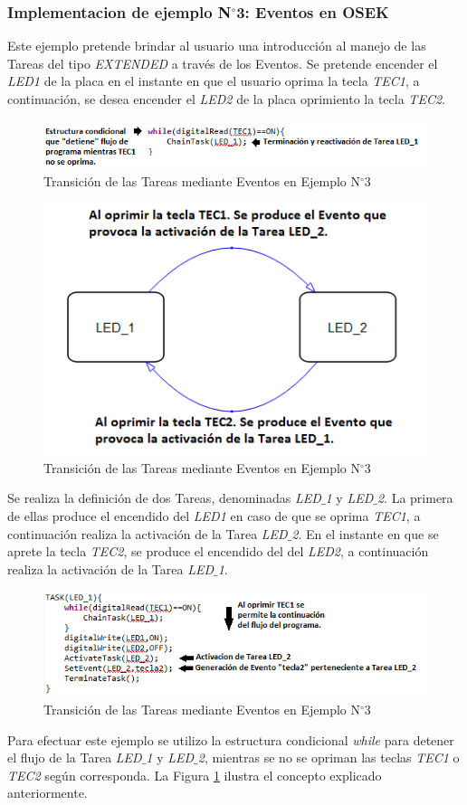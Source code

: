 \documentclass[12pt,letterpaper]{article}
\begin{document}
\subsubsection{Implementacion de ejemplo N$^{\circ}$3: Eventos en OSEK}
Este ejemplo pretende brindar al usuario una introducción al manejo de las Tareas del tipo \textit{EXTENDED} a través de los Eventos. Se pretende encender el \textit{LED1} de la placa en el instante en que el usuario oprima la tecla \textit{TEC1}, a continuación, se desea encender el \textit{LED2} de la placa oprimiento la tecla \textit{TEC2}.
\begin{center}
\begin{figure}[!h]
\centering
\includegraphics[width=10 cm]{figuras/f41.png}
\caption{Transición de las Tareas mediante Eventos en Ejemplo N$^{\circ}$3}
\label{ejemplo3}
\end{figure}
\end{center}
\begin{figure}[!h]
\centering
\includegraphics[width=9 cm]{figuras/f26.png}
\caption{Transición de las Tareas mediante Eventos en Ejemplo N$^{\circ}$3}
\label{Fig41}
\end{figure}
Se realiza la definición de dos Tareas, denominadas \textit{LED$\_$1} y \textit{LED$\_$2}. La primera de ellas produce el encendido del \textit{LED1} en caso de que se oprima \textit{TEC1}, a continuación realiza la activación de la Tarea \textit{LED$\_$2}. En el instante en que se aprete la tecla \textit{TEC2}, se produce el encendido del del \textit{LED2}, a continuación realiza la activación de la Tarea \textit{LED$\_$1}.
\begin{figure}[!h]
\centering
\includegraphics[width=8 cm]{figuras/f42.png}
\caption{Transición de las Tareas mediante Eventos en Ejemplo N$^{\circ}$3}
\label{ejemplo3transicion}
\end{figure}
Para efectuar este ejemplo se utilizo la estructura condicional \textit{while} para detener el flujo de la Tarea \textit{LED$\_$1} y \textit{LED$\_$2}, mientras se no se opriman las teclas \textit{TEC1} o \textit{TEC2} según corresponda. La Figura \ref{ejemplo3} ilustra el concepto explicado anteriormente.
\end{document}
